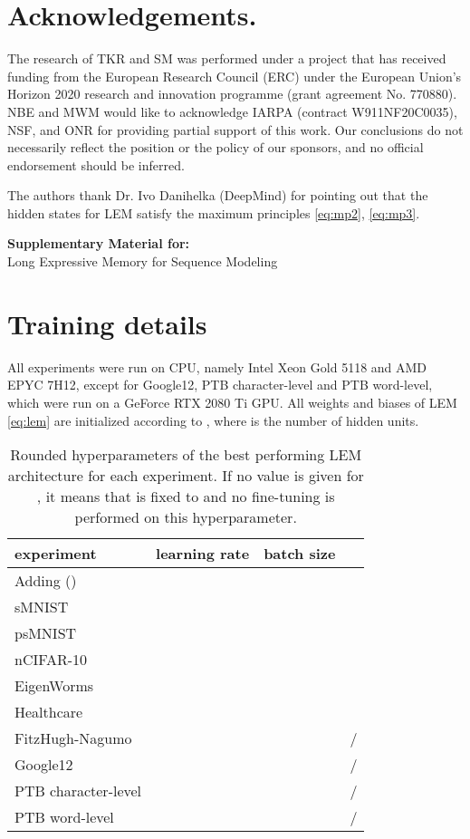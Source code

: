 \documentclass{article} \usepackage{iclr2022_conference,times}
\begin{document}
\clearpage

\section*{Acknowledgements.} The research of TKR and SM was performed under a project that has received funding from the European Research Council (ERC) under the European Union’s Horizon 2020 research and innovation programme (grant agreement No. 770880). NBE and MWM would like to
acknowledge IARPA (contract W911NF20C0035), NSF, and ONR for providing partial support of this work. Our conclusions do not necessarily reflect the position or the policy of our sponsors, and no official endorsement should be inferred. 

The authors thank Dr. Ivo Danihelka (DeepMind) for pointing out that the hidden states for LEM satisfy the maximum principles \eqref{eq:mp2}, \eqref{eq:mp3}.








\appendix
\newpage
\begin{center}
{\bf Supplementary Material for:}\\
Long Expressive Memory for Sequence Modeling
\end{center}
\section{Training details}
\label{app:training_details}
All experiments were run on CPU, namely Intel Xeon Gold 5118 and AMD EPYC 7H12, except for Google12, PTB character-level and PTB word-level, which were run on a GeForce RTX 2080 Ti GPU. All weights and biases of LEM \eqref{eq:lem} are initialized according to , where  is the number of hidden units. 

\begin{table}[ht!]
  \caption{Rounded hyperparameters of the best performing LEM architecture for each experiment. If no value is given for , it means that  is fixed to  and no fine-tuning is performed on this hyperparameter.}
  \label{tab:hyperparameters_rounded}
  \centering
  \begin{tabular}{lccc}
    \toprule
    \cmidrule(r){1-4}
    experiment & learning rate & batch size  &  \\
    \midrule
Adding () &  &  & \\
sMNIST &  &  &  \\
psMNIST &  &  &  \\
nCIFAR-10  &  &  &  \\
EigenWorms  &  &  &  \\
Healthcare &  &  &  \\
FitzHugh-Nagumo & &  & / \\
Google12 &  &  & / \\
PTB character-level &  &  & / \\
PTB word-level &  &  & / \\

    \bottomrule
  \end{tabular}
\end{table}
\end{document}
